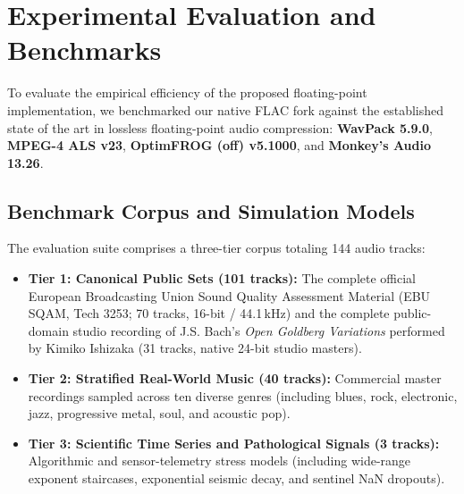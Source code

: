 \documentclass[10pt,twocolumn]{article}
\begin{document}
\printbibliography

\appendix

\section{Experimental Evaluation and Benchmarks}
\label{sec:benchmarks}

To evaluate the empirical efficiency of the proposed floating-point implementation, we benchmarked our native FLAC fork against the established state of the art in lossless floating-point audio compression: \textbf{WavPack 5.9.0}, \textbf{MPEG-4 ALS v23}, \textbf{OptimFROG (off) v5.1000}, and \textbf{Monkey's Audio 13.26}.

\subsection{Benchmark Corpus and Simulation Models}
The evaluation suite comprises a three-tier corpus totaling 144 audio tracks:
\begin{itemize}
	\item \textbf{Tier 1: Canonical Public Sets (101 tracks):} The complete official European Broadcasting Union Sound Quality Assessment Material (EBU SQAM, Tech 3253; 70 tracks, 16-bit / 44.1\,kHz) and the complete public-domain studio recording of J.S. Bach's \textit{Open Goldberg Variations} performed by Kimiko Ishizaka (31 tracks, native 24-bit studio masters).
	\item \textbf{Tier 2: Stratified Real-World Music (40 tracks):} Commercial master recordings sampled across ten diverse genres (including blues, rock, electronic, jazz, progressive metal, soul, and acoustic pop).
	\item \textbf{Tier 3: Scientific Time Series and Pathological Signals (3 tracks):} Algorithmic and sensor-telemetry stress models (including wide-range exponent staircases, exponential seismic decay, and sentinel NaN dropouts).
\end{itemize}
\end{document}
